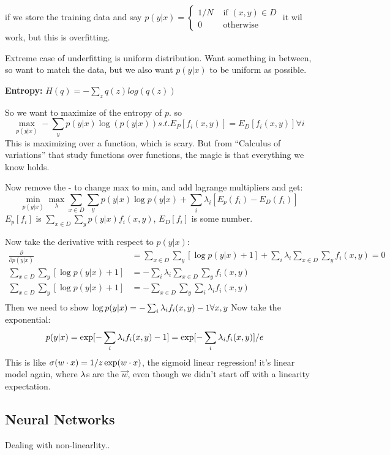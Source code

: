 if we store the training data and say $p(y|x) =
\begin{cases}
  1/N & \text{ if }(x,y)\in D\\
0 & \text{ otherwise}
\end{cases}$ it wil work, but this is overfitting.

Extreme case of underfitting is uniform distribution. Want something
in between, so want to match the data, but we also want $p(y|x)$ to be
uniform as possible.

\textbf{Entropy:} $H(q) = -\sum_z q(z)log(q(z))$

So we want to maximize of the entropy of $p$. so 
$$\max_{p(y|x)}-\sum_yp(y|x)\log(p(y|x)) s.t. E_P[f_i(x,y)] =
E_D[f_i(x,y)]\forall i$$
This is maximizing over a function, which is scary. But from ``Calculus of
variations'' that study functions over functions, the magic is that
everything we know holds.

Now remove the - to change max to min, and add lagrange multipliers
and get:
$$\min_{p(y|x)}\max_\lambda\sum_{x\in D}\sum_yp(y|x)\log p(y|x) + \sum_i \lambda_i[E_p(f_i) -
E_D(f_i)]$$
$E_p[f_i]$ is $\sum_{x\in D}\sum_y p(y|x)f_i(x,y)$, $E_D[f_i]$ is some
number.

Now take the derivative with respect to $p(y|x)$:
\begin{align*}
\frac{\partial}{\partial p(y|x)}&= \sum_{x\in D}\sum_{y}[\log p(y|x)
+ 1] + \sum_i\lambda_i\sum_{x\in D}\sum_yf_i(x,y) = 0\\  
\sum_{x\in D}\sum_{y}[\log p(y|x)
+ 1] &= - \sum_i\lambda_i\sum_{x\in D}\sum_yf_i(x,y)\\
\sum_{x\in D}\sum_{y}[\log p(y|x)
+ 1] &= - \sum_{x\in D}\sum_y\sum_i\lambda_if_i(x,y)\\
\end{align*}
Then we need to show $\log p(y|x) = -\sum_i \lambda_if_i(x,y) - 1 \forall
x,y$
Now take the exponential:
\begin{align*}
  p(y|x) &= \exp[-\sum_i \lambda_if_i(x,y) - 1 ] = \exp[-\sum_i
  \lambda_if_i(x,y)]/e
\end{align*}
This is like $\sigma(w\cdot x) = 1/z \exp(w\cdot x)$, the sigmoid linear
regression! it's linear model
again, where $\lambda$s are the $\vec w$, even though we didn't start off
with a linearity expectation.

\subsection{Neural Networks}
\label{sec:neuralnetworks}
Dealing with non-linearlity..

